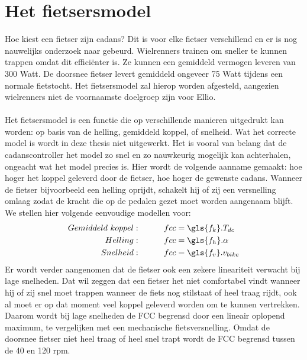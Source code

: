 \section{Het fietsersmodel}
Hoe kiest een fietser zijn cadans? Dit is voor elke fietser verschillend en er is nog nauwelijks onderzoek naar gebeurd. Wielrenners trainen om sneller te kunnen trappen omdat dit efficiënter is. Ze kunnen een gemiddeld vermogen leveren van 300 Watt. De doorsnee fietser levert gemiddeld ongeveer 75 Watt tijdens een normale fietstocht. Het fietsersmodel zal hierop worden afgesteld, aangezien wielrenners niet de voornaamste doelgroep zijn voor Ellio.
\\\\
Het fietsersmodel is een functie die op verschillende manieren uitgedrukt kan worden: op basis van de helling, gemiddeld koppel, of snelheid. Wat het correcte model is wordt in deze thesis niet uitgewerkt. Het is vooral van belang dat de cadanscontroller het model zo snel en zo nauwkeurig mogelijk kan achterhalen, ongeacht wat het model precies is. Hier wordt de volgende aanname gemaakt: hoe hoger het koppel geleverd door de fietser, hoe hoger de gewenste cadans. Wanneer de fietser bijvoorbeeld een helling oprijdt, schakelt hij of zij een versnelling omlaag zodat de kracht die op de pedalen gezet moet worden aangenaam blijft. We stellen hier volgende eenvoudige modellen voor:
\begin{align*}
Gemiddeld \ koppel:\tab fcc &= \gls{f_k} . T_{dc}\\
Helling:\tab fcc &= \gls{f_h} . \alpha\\
Snelheid:\tab fcc &= \gls{f_v} . v_{bike}
\end{align*}
Er wordt verder aangenomen dat de fietser ook een zekere lineariteit verwacht bij lage snelheden. Dat wil zeggen dat een fietser het niet comfortabel vindt wanneer hij of zij snel moet trappen wanneer de fiets nog stilstaat of heel traag rijdt, ook al moet er op dat moment veel koppel geleverd worden om te kunnen vertrekken. Daarom wordt bij lage snelheden de FCC begrensd door een lineair oplopend maximum, te vergelijken met een mechanische fietsversnelling. Omdat de doorsnee fietser niet heel traag of heel snel trapt wordt de FCC begrensd tussen de 40 en 120 rpm.
